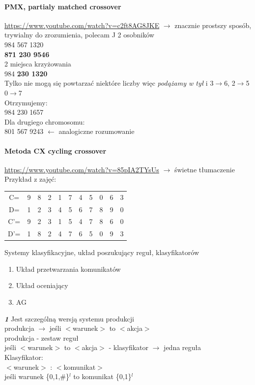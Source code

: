 \documentclass{article}
\begin{document}
		\paragraph{PMX, partialy matched crossover}
		\url{https://www.youtube.com/watch?v=c2ft8AG8JKE} $\rightarrow$ znacznie prostszy sposób, trywialny do zrozumienia, polecam ^^
		2 osobników\\
		984 567 1320\\
		\textbf{871 230 9546}\\
		2 miejsca krzyżowania\\
		984 \textbf{230 1320}\\
		Tylko nie mogą się powtarzać niektóre liczby więc \textit{podążamy w tył} i 3$\rightarrow$6, 2$\rightarrow$5 0$\rightarrow$7\\ 
		Otrzymujemy:\\
		984 230 1657\\
		Dla drugiego chromosomu:\\
		801 567 9243 $\leftarrow$ analogiczne rozumowanie\\
		
		\paragraph{Metoda CX cycling crossover}
		\url{https://www.youtube.com/watch?v=85pIA2TYsUs} $\rightarrow$ świetne tłumaczenie\\
		Przykład z zajęć:
		\begin{table}
			\begin{tabular}{c|c|c|c|c|c|c|c|c|c|c}
				C=	&9	&8	&2	&1	&7	&4	&5	&0	&6	&3\\
				D=	&1	&2	&3	&4	&5	&6	&7	&8	&9	&0\\
				C'=	&9	&2	&3	&1	&5	&4	&7	&8	&6	&0\\
				D'=	&1	&8	&2	&4	&7	&6	&5	&0	&9	&3\\
			\end{tabular}
		\end{table}
		
		Systemy klasyfikacyjne, układ poszukujący reguł, klasyfikatorów
		\begin{enumerate}
			\item Układ przetwarzania komunikatów
			\item Układ oceniający
			\item AG
		\end{enumerate}
		\textbf{\textit{1}} Jest szczególną wersją systemu produkcji\\
		produkcja $\rightarrow$ jeśli $<$warunek$>$ to $<$akcja$>$ \\
		produkcja - zestaw reguł\\
		jeśli $<$warunek$>$ to $<$akcja$>$ - klasyfikator $\rightarrow$ jedna reguła \\
		Klasyfikator:\\
		$<$warunek$>$ : $<$komunikat$>$\\
		jeśli warunek \{0,1,\#\}$^l$ to komunikat \{0,1\}$^l$
			
\end{document}
